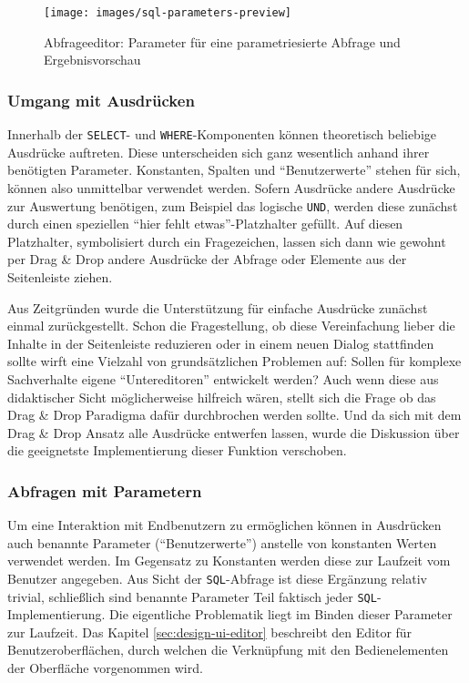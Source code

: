 \begin{figure}[p]
  \texttt{[image: images/sql-parameters-preview]}
  \caption{Abfrageeditor: Parameter für eine parametriesierte Abfrage und Ergebnisvorschau}
  \label{fig:screen-sql-editor-parameters-preview}
\end{figure}

\subsubsection{Umgang mit Ausdrücken}

Innerhalb der \texttt{SELECT}- und \texttt{WHERE}-Komponenten können theoretisch beliebige Ausdrücke auftreten. Diese unterscheiden sich ganz wesentlich anhand ihrer benötigten Parameter. Konstanten, Spalten und "`Benutzerwerte"' stehen für sich, können also unmittelbar verwendet werden. Sofern Ausdrücke andere Ausdrücke zur Auswertung benötigen, zum Beispiel das logische \texttt{UND}, werden diese zunächst durch einen speziellen "`hier fehlt etwas"'-Platzhalter gefüllt. Auf diesen Platzhalter, symbolisiert durch ein Fragezeichen, lassen sich dann wie gewohnt per Drag \& Drop andere Ausdrücke der Abfrage oder Elemente aus der Seitenleiste ziehen.

Aus Zeitgründen wurde die Unterstützung für einfache Ausdrücke zunächst einmal zurückgestellt. Schon die Fragestellung, ob diese Vereinfachung lieber die Inhalte in der Seitenleiste reduzieren oder in einem neuen Dialog stattfinden sollte wirft eine Vielzahl von grundsätzlichen Problemen auf: Sollen für komplexe Sachverhalte eigene "`Untereditoren"' entwickelt werden? Auch wenn diese aus didaktischer Sicht möglicherweise hilfreich wären, stellt sich die Frage ob das Drag \& Drop Paradigma dafür durchbrochen werden sollte. Und da sich mit dem Drag \& Drop Ansatz alle Ausdrücke entwerfen lassen, wurde die Diskussion über die geeignetste Implementierung dieser Funktion verschoben.

\subsubsection{Abfragen mit Parametern}
\label{sec:design-query-params}

Um eine Interaktion mit Endbenutzern zu ermöglichen können in Ausdrücken auch benannte Parameter ("`Benutzerwerte"') anstelle von konstanten Werten verwendet werden. Im Gegensatz zu Konstanten werden diese zur Laufzeit vom Benutzer angegeben. Aus Sicht der \texttt{SQL}-Abfrage ist diese Ergänzung relativ trivial, schließlich sind benannte Parameter Teil faktisch jeder \texttt{SQL}-Implementierung. Die eigentliche Problematik liegt im Binden dieser Parameter zur Laufzeit. Das Kapitel \ref{sec:design-ui-editor} beschreibt den Editor für Benutzeroberflächen, durch welchen die Verknüpfung mit den Bedienelementen der Oberfläche vorgenommen wird.

